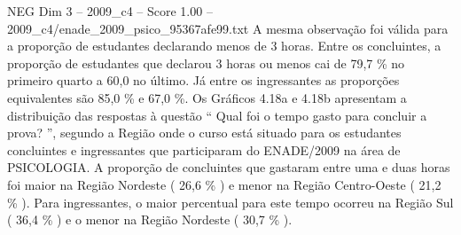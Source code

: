 \begin{textsample}{NEG Dim 3 – 2009\_c4 – Score 1.00 – 2009\_c4/enade\_2009\_psico\_95367afe99.txt}
A mesma observação foi válida para a proporção de estudantes declarando menos de 3 horas.
Entre os concluintes, a proporção de estudantes que declarou 3 horas ou menos cai de 79,7 \% no primeiro quarto a 60,0 no último.
Já entre os ingressantes as proporções equivalentes são 85,0 \% e 67,0 \%.
Os Gráficos 4.18a e 4.18b apresentam a distribuição das respostas à questão “ Qual foi o tempo gasto para concluir a prova? ”, segundo a Região onde o curso está situado para os estudantes concluintes e ingressantes que participaram do ENADE/2009 na área de PSICOLOGIA.
A proporção de concluintes que gastaram entre uma e duas horas foi maior na Região Nordeste ( 26,6 \% ) e menor na Região Centro-Oeste ( 21,2 \% ).
Para ingressantes, o maior percentual para este tempo ocorreu na Região Sul ( 36,4 \% ) e o menor na Região Nordeste ( 30,7 \% ).

\end{textsample}

